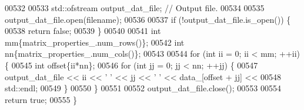 \begin{DoxyCode}
00532 
00533   std::ofstream output\_dat\_file;  \textcolor{comment}{// Output file.}
00534 
00535   output\_dat\_file.open(filename);
00536 
00537   \textcolor{keywordflow}{if} (!output\_dat\_file.is\_open()) \{
00538     \textcolor{keywordflow}{return} \textcolor{keyword}{false};
00539   \}
00540 
00541   \textcolor{keywordtype}{int} mm\{matrix\_properties\_.num\_rows()\};
00542   \textcolor{keywordtype}{int} nn\{matrix\_properties\_.num\_cols()\};
00543 
00544   \textcolor{keywordflow}{for} (\textcolor{keywordtype}{int} ii = 0; ii < mm; ++ii) \{
00545     \textcolor{keywordtype}{int} offset\{ii*nn\};
00546     \textcolor{keywordflow}{for} (\textcolor{keywordtype}{int} jj = 0; jj < nn; ++jj) \{
00547       output\_dat\_file << ii << \textcolor{charliteral}{' '} << jj << \textcolor{charliteral}{' '} << data\_[offset + jj] <<
00548         std::endl;
00549     \}
00550   \}
00551 
00552   output\_dat\_file.close();
00553 
00554   \textcolor{keywordflow}{return} \textcolor{keyword}{true};
00555 \}
\end{DoxyCode}
